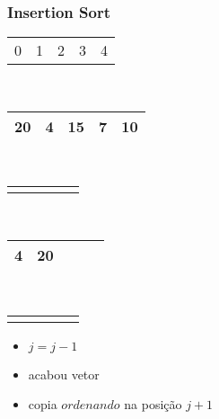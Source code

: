 \documentclass{beamer}
\begin{document}
\begin{frame}
    \frametitle{Insertion Sort}
    \begin{center}
        \begin{table}
            \begin{tabular}{p{0.25cm} p{0.25cm} p{0.25cm} p{0.25cm} p{0.25cm}}
                0 & 1 & 2 & 3 & 4
            \end{tabular} \\
            \begin{tabular}{| p{0.25cm} | p{0.25cm} | p{0.25cm} | p{0.25cm} | p{0.25cm} |}
                \hline
                20 & 4 & 15 & 7 & 10 \\ \hline
            \end{tabular} \\
            \begin{tabular}{p{0.25cm} p{0.25cm} p{0.25cm} p{0.25cm} p{0.25cm}}
                & \color{green}{$\uparrow$} & & &
            \end{tabular} \\
            \begin{tabular}{| p{0.25cm} | p{0.25cm} | p{0.25cm} | p{0.25cm} | p{0.25cm} |}
                \hline
                4 & 20 & & & \\ \hline
            \end{tabular} \\
            \begin{tabular}{p{0.25cm} p{0.25cm} p{0.25cm} p{0.25cm} p{0.25cm}}
                \color{red}{$\uparrow$} & \color{blue}{$\uparrow$} & & &
            \end{tabular}
        \end{table}
	\end{center}
    \color{green}{$ordenando = 4$}
    \begin{itemize}[<+->]
        \item $j = j - 1$
        \item acabou vetor
        \item copia $ordenando$ na posição $j + 1$
    \end{itemize}
\end{frame}
\end{document}
